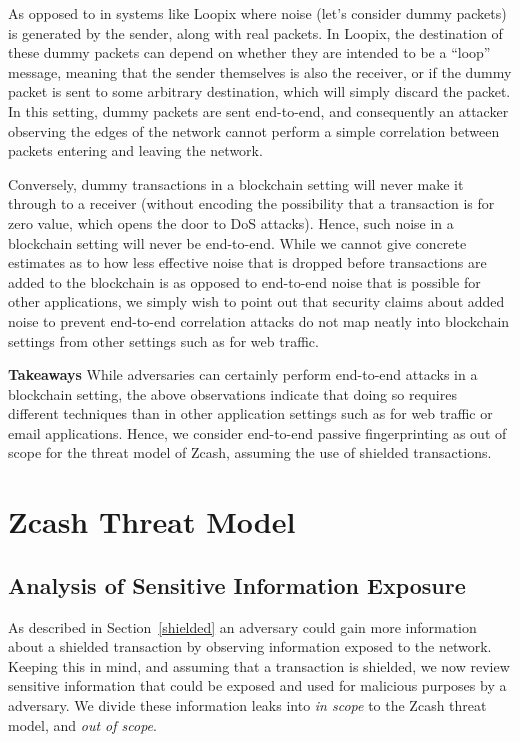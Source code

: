 \documentclass{article}
\begin{document}
As opposed to in systems like Loopix where noise (let's consider dummy packets)
is generated by the sender, along with real packets. In Loopix, the destination
of these dummy packets can depend on whether they are intended to be a ``loop''
message, meaning that the sender themselves is also the receiver, or if the
dummy packet is sent to some arbitrary destination, which will simply discard
the packet. In this setting, dummy packets are sent end-to-end, and
consequently an attacker observing the edges of the network cannot perform a
simple correlation between packets entering and leaving the network.

Conversely, dummy transactions in a blockchain setting will never make it
through to a receiver (without encoding the possibility that a transaction is
for zero value, which opens the door to DoS attacks). Hence, such noise in a
blockchain setting will never be end-to-end. While we cannot give concrete
estimates as to how less effective noise that is dropped before transactions
are added to the blockchain is as opposed to end-to-end noise that is possible
for other applications, we simply wish to point out that security claims about
added noise to prevent end-to-end correlation attacks do not map neatly into
blockchain settings from other settings such as for web traffic.

\textbf{Takeaways}
While adversaries can certainly perform end-to-end attacks in a blockchain
setting, the above observations indicate that doing so requires different
techniques than in other application settings such as for web traffic or email
applications. Hence, we consider end-to-end passive fingerprinting
as out of scope for the threat model of Zcash, assuming the use of shielded
transactions.


\section{Zcash Threat Model}
\label{threat-model}

\subsection{Analysis of Sensitive Information Exposure}
As described in Section~\ref{shielded} an adversary could gain more information
about a shielded transaction by observing information exposed to the network.
Keeping this in mind, and assuming that a transaction is shielded, we now
review sensitive information that could be exposed and used for malicious
purposes by a adversary.
We divide these information leaks into \emph{in scope} to the Zcash threat
model, and \emph{out of scope}.
\end{document}
